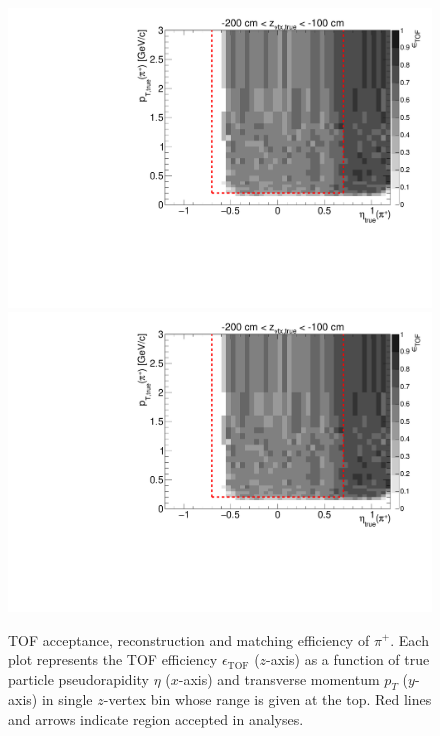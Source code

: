 \begin{figure}[hb]
\caption[TOF acceptance, reconstruction and matching efficiency of $\pi^{+}$.]{TOF acceptance, reconstruction and matching efficiency of $\pi^{+}$. Each plot represents the TOF efficiency $\epsilon_{\text{TOF}}$ ($z$-axis) as a function of true particle pseudorapidity $\eta$ ($x$-axis) and transverse momentum $p_{T}$ ($y$-axis) in single $z$-vertex bin whose range is given at the top. Red lines and arrows indicate region accepted in analyses.}\label{fig:tofEff_pion_plus}
\centering
\parbox{0.495\textwidth}{
  \centering
  \includegraphics[width=\linewidth,page=3]{graphics/eff/Eff2D_TOF_pion_Plus.pdf}\\
  \includegraphics[width=\linewidth,page=5]{graphics/eff/Eff2D_TOF_pion_Plus.pdf}\\
}
\end{figure}
